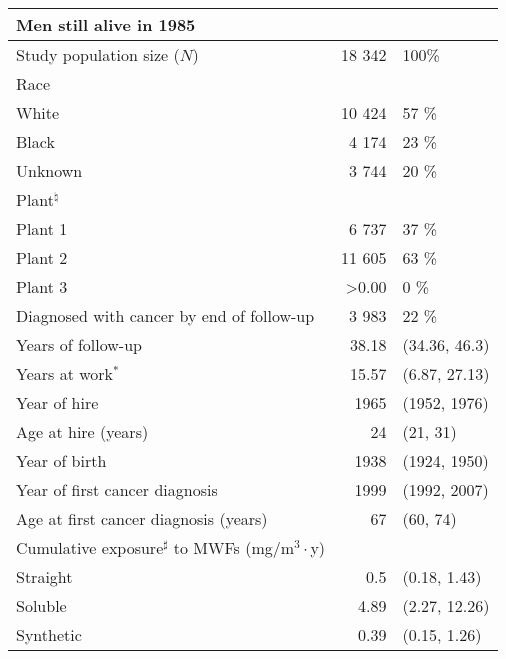 \documentclass[10pt,]{article}
\begin{document}
\hypertarget{section-2}{%
\section{}\label{section-2}}

\begin{table}[H]
\centering
\begin{tabular}{lrl}
  \toprule
\multicolumn{3}{l}{Men still alive in 1985}\\%
  \midrule
Study population size ($N$) & 18 342 & 100\% \\ 
  Race &  &  \\ 
  \hspace{10pt}White & 10 424 & 57 \% \\ 
  \hspace{10pt}Black & 4 174 & 23 \% \\ 
  \hspace{10pt}Unknown & 3 744 & 20 \% \\ 
  Plant$^\natural$ &  &  \\ 
  \hspace{10pt}Plant 1 & 6 737 & 37 \% \\ 
  \hspace{10pt}Plant 2 & 11 605 & 63 \% \\ 
  \hspace{10pt}Plant 3 & >0.00 & 0 \% \\ 
  Diagnosed with cancer by end of follow-up & 3 983 & 22 \% \\ 
  \hline Years of follow-up & 38.18 & (34.36, 46.3) \\ 
  Years at work$^*$ & 15.57 & (6.87, 27.13) \\ 
  Year of hire & 1965 & (1952, 1976) \\ 
  Age at hire (years) & 24 & (21, 31) \\ 
  Year of birth & 1938 & (1924, 1950) \\ 
  Year of first cancer diagnosis & 1999 & (1992, 2007) \\ 
  Age at first cancer diagnosis (years) & 67 & (60, 74) \\ 
  Cumulative exposure$^\sharp$ to MWFs (mg/m$^3\cdot$y) &  &  \\ 
  \hspace{10pt}Straight & 0.5 & (0.18, 1.43) \\ 
  \hspace{10pt}Soluble & 4.89 & (2.27, 12.26) \\ 
  \hspace{10pt}Synthetic & 0.39 & (0.15, 1.26) \\ 
   \bottomrule
\end{tabular}
\end{table}
\end{document}
